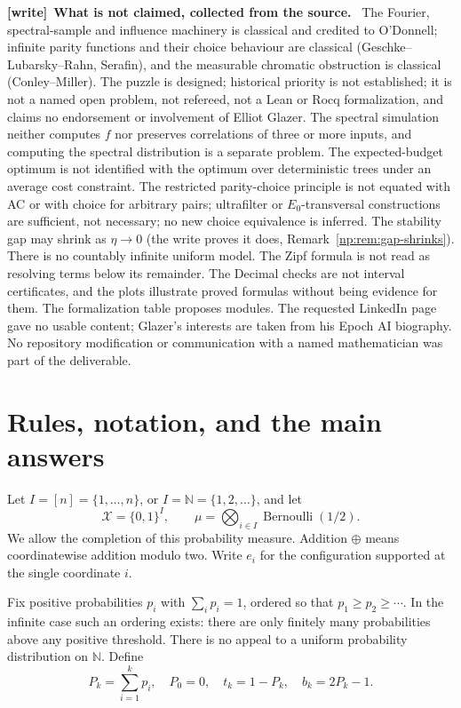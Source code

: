 \documentclass[11pt,a4paper]{article}
\theoremstyle{definition}
\theoremstyle{remark}
\newcommand{\N}{\mathbb N}
\newcommand{\cX}{\mathcal X}
\newenvironment{writenote}[1][]{\par\smallskip\begingroup\small
 \noindent\textbf{[write]}\if\relax\detokenize{#1}\relax\else~\textbf{#1.}\fi\ }%
 {\par\endgroup\smallskip}
\begin{document}
\begin{writenote}[What is not claimed, collected from the source]
The Fourier, spectral-sample and influence machinery is classical and
credited to O'Donnell; infinite parity functions and their choice behaviour
are classical (Geschke--Lubarsky--Rahn, Serafin), and the measurable
chromatic obstruction is classical (Conley--Miller). The puzzle is designed;
historical priority is not established; it is not a named open problem,
not refereed, not a Lean or Rocq formalization, and claims no endorsement or
involvement of Elliot Glazer. The spectral simulation neither computes $f$
nor preserves correlations of three or more inputs, and computing the
spectral distribution is a separate problem. The expected-budget optimum is
not identified with the optimum over deterministic trees under an average
cost constraint. The restricted parity-choice principle is not equated with
AC or with choice for arbitrary pairs; ultrafilter or
$E_0$-transversal constructions are sufficient, not necessary; no new choice
equivalence is inferred. The stability gap may shrink as $\eta\to0$ (the
write proves it does, Remark~\ref{np:rem:gap-shrinks}). There is no
countably infinite uniform model. The Zipf formula is not read as resolving
terms below its remainder. The Decimal checks are not interval
certificates, and the plots illustrate proved formulas without being
evidence for them. The formalization table proposes modules. The requested
LinkedIn page gave no usable content; Glazer's interests are taken from his
Epoch AI biography. No repository modification or communication with a
named mathematician was part of the deliverable.
\end{writenote}

\section{Rules, notation, and the main answers}\label{np:sec:rules}

Let \(I=[n]=\{1,\ldots,n\}\), or \(I=\N=\{1,2,\ldots\}\), and let
\[
 \cX=\{0,1\}^{I},\qquad
 \mu=\bigotimes_{i\in I}\operatorname{Bernoulli}(1/2).
\]
We allow the completion of this probability measure. Addition
\(\oplus\) means coordinatewise addition modulo two. Write \(e_i\) for
the configuration supported at the single coordinate \(i\).

Fix positive probabilities \(p_i\) with \(\sum_i p_i=1\), ordered so that
\(p_1\ge p_2\ge\cdots\). In the infinite case such an ordering exists:
there are only finitely many probabilities above any positive threshold.
There is no appeal to a uniform probability distribution on \(\N\).
Define
\[
 P_k=\sum_{i=1}^k p_i,\quad P_0=0,\quad
 t_k=1-P_k,\quad b_k=2P_k-1.
\]
\end{document}
